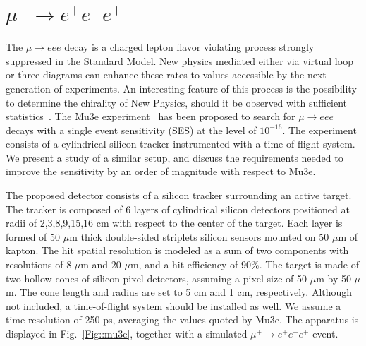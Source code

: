 \section{$\mu^+\to e^+e^-e^+$}
\label{mutoeee}

The $\mu \rightarrow eee$ decay is a charged lepton flavor violating process strongly suppressed in the Standard Model. New physics mediated either via virtual loop or three diagrams can enhance these rates to values accessible by the next generation of experiments. An interesting feature of this process is 
the possibility to determine the chirality of New Physics, should it be observed with sufficient statistics~\cite{Okada:1999zk}. The Mu3e experiment~\cite{Blondel:2013ia} has been proposed to search for $\mu \rightarrow eee$ decays with a single event sensitivity (SES) at the level of $10^{-16}$. The experiment consists of a cylindrical silicon tracker instrumented with a time of flight system. We present a study of a similar setup, and discuss the requirements needed to improve the sensitivity by an order of magnitude with respect to Mu3e.
 
The proposed detector consists of a silicon tracker surrounding an active target. The tracker is composed of 6 layers of cylindrical silicon detectors positioned at radii of 2,3,8,9,15,16 cm with respect to the center of the target. Each layer is formed of 50 $\mu$m thick double-sided striplets silicon sensors mounted on 50 $\mu$m of kapton. The hit spatial resolution is modeled as a sum of two components with resolutions of 8 $\mu$m and 20 $\mu$m, and a hit efficiency of 90\%. The target is made of two hollow cones of silicon pixel detectors, assuming a pixel size of 50 $\mu$m by 50 $\mu$m. The cone length and radius are set to 5 cm and 1 cm, respectively. Although not included, a time-of-flight system should be installed as well. We assume a time resolution of 250 ps, averaging the values quoted by Mu3e. The apparatus is displayed in Fig.~\ref{Fig::mu3e}, together with a simulated $\mu^+ \rightarrow e^+e^-e^+$ event.

